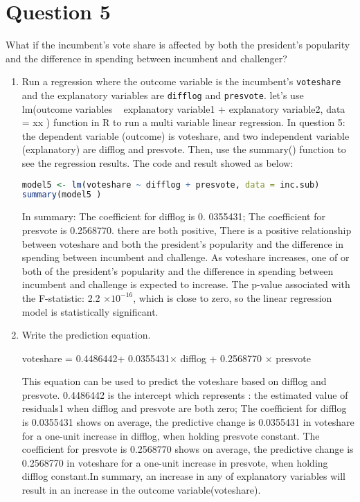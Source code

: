 \documentclass[12pt,letterpaper]{article}
\begin{document}
\section*{Question 5}
\noindent What if the incumbent's vote share is affected by both the president's popularity and the difference in spending between incumbent and challenger? 
	\begin{enumerate}
		\item Run a regression where the outcome variable is the incumbent's \texttt{voteshare} and the explanatory variables are \texttt{difflog} and \texttt{presvote}.	\vspace{1cm}
\noindent let's use lm(outcome variables ~ explanatory variable1 + explanatory 
        variable2, data = xx ) function in R  to run a multi variable linear 
           regression. In question 5: the dependent variable (outcome) is  voteshare, and two independent variable (explanatory) are difflog and presvote. Then, use the summary() function to see the regression results. The code and result showed as below:  
 \begin{lstlisting}[language=R] 
model5 <- lm(voteshare ~ difflog + presvote, data = inc.sub)
summary(model5 )
 \end{lstlisting} 

\noindent In summary: The coefficient for difflog is 0. 0355431; The coefficient for presvote is 0.2568770. there are both positive, There is a positive relationship between voteshare  and both the president’s popularity and the difference in spending between incumbent and challenge.  As voteshare increases,  one of or both of the president’s popularity and the difference in spending between incumbent and challenge is expected to increase. The p-value associated with the F-statistic: 2.2 $\times 10^{-16}$,  
which is close to zero, so the linear regression model is statistically significant.
           
		\item Write the prediction equation.	\vspace{1cm}
  
                  voteshare = 0.4486442+ 0.0355431× difflog + 0.2568770 × presvote
                  
This equation can be used to predict the voteshare  based on difflog and presvote.  0.4486442 is the intercept which represents : the estimated value of residuals1 when difflog and presvote are both zero; The coefficient for difflog is 
0.0355431 shows on average,  the predictive change is 0.0355431 in voteshare for a one-unit increase in difflog, when holding presvote constant. The coefficient for presvote is 0.2568770 shows on average,  the predictive change is 0.2568770 in voteshare for a one-unit increase in presvote, when holding difflog constant.In summary, an increase in any of explanatory variables will result in an increase in the outcome variable(voteshare).



\end{enumerate}
\end{document}
